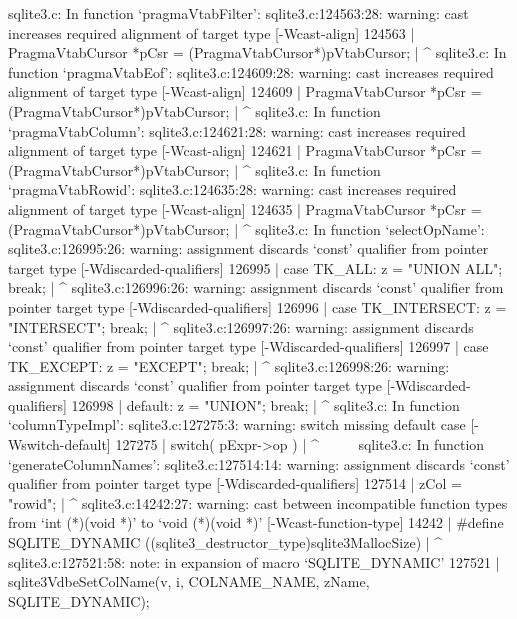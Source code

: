 {{{{{{{{{{{{{{{{{{sqlite3.c: In function ‘pragmaVtabFilter’:
sqlite3.c:124563:28: warning: cast increases required alignment of target type [-Wcast-align]
124563 |   PragmaVtabCursor *pCsr = (PragmaVtabCursor*)pVtabCursor;
       |                            ^
sqlite3.c: In function ‘pragmaVtabEof’:
sqlite3.c:124609:28: warning: cast increases required alignment of target type [-Wcast-align]
124609 |   PragmaVtabCursor *pCsr = (PragmaVtabCursor*)pVtabCursor;
       |                            ^
sqlite3.c: In function ‘pragmaVtabColumn’:
sqlite3.c:124621:28: warning: cast increases required alignment of target type [-Wcast-align]
124621 |   PragmaVtabCursor *pCsr = (PragmaVtabCursor*)pVtabCursor;
       |                            ^
sqlite3.c: In function ‘pragmaVtabRowid’:
sqlite3.c:124635:28: warning: cast increases required alignment of target type [-Wcast-align]
124635 |   PragmaVtabCursor *pCsr = (PragmaVtabCursor*)pVtabCursor;
       |                            ^
sqlite3.c: In function ‘selectOpName’:
sqlite3.c:126995:26: warning: assignment discards ‘const’ qualifier from pointer target type [-Wdiscarded-qualifiers]
126995 |     case TK_ALL:       z = "UNION ALL";   break;
       |                          ^
sqlite3.c:126996:26: warning: assignment discards ‘const’ qualifier from pointer target type [-Wdiscarded-qualifiers]
126996 |     case TK_INTERSECT: z = "INTERSECT";   break;
       |                          ^
sqlite3.c:126997:26: warning: assignment discards ‘const’ qualifier from pointer target type [-Wdiscarded-qualifiers]
126997 |     case TK_EXCEPT:    z = "EXCEPT";      break;
       |                          ^
sqlite3.c:126998:26: warning: assignment discards ‘const’ qualifier from pointer target type [-Wdiscarded-qualifiers]
126998 |     default:           z = "UNION";       break;
       |                          ^
sqlite3.c: In function ‘columnTypeImpl’:
sqlite3.c:127275:3: warning: switch missing default case [-Wswitch-default]
127275 |   switch( pExpr->op ){
       |   ^~~~~~
sqlite3.c: In function ‘generateColumnNames’:
sqlite3.c:127514:14: warning: assignment discards ‘const’ qualifier from pointer target type [-Wdiscarded-qualifiers]
127514 |         zCol = "rowid";
       |              ^
sqlite3.c:14242:27: warning: cast between incompatible function types from ‘int (*)(void *)’ to ‘void (*)(void *)’ [-Wcast-function-type]
14242 | #define SQLITE_DYNAMIC   ((sqlite3_destructor_type)sqlite3MallocSize)
      |                           ^
sqlite3.c:127521:58: note: in expansion of macro ‘SQLITE_DYNAMIC’
127521 |         sqlite3VdbeSetColName(v, i, COLNAME_NAME, zName, SQLITE_DYNAMIC);
}}}}}}}}}}}}}}}}}}}
